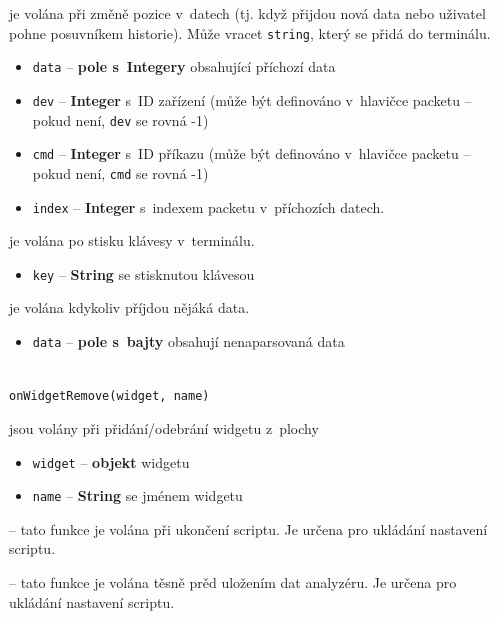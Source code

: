 \documentclass[12pt, a4paper, oneside]{article}
\begin{document}
 je volána při změně pozice v~datech (tj. když přijdou nová data nebo uživatel pohne posuvníkem historie). Může vracet \verb/string/, který se přidá do terminálu.

\begin{itemize}
    \item \verb/data/ -- {\bf pole s~Integery} obsahující příchozí data
    \item \verb/dev/ -- {\bf Integer} s~ID zařízení (může být definováno v~hlavičce packetu -- pokud není, \verb/dev/ se rovná -1)
    \item \verb/cmd/ -- {\bf Integer} s~ID příkazu (může být definováno v~hlavičce packetu -- pokud není, \verb/cmd/ se rovná -1)
    \item \verb/index/ -- {\bf Integer} s~indexem packetu v~příchozích datech.
\end{itemize}

 je volána po stisku klávesy v~terminálu.
\begin{itemize}
    \item \verb/key/ -- {\bf String} se stisknutou klávesou
\end{itemize}

 je volána kdykoliv příjdou nějáká data.
\begin{itemize}
    \item \verb/data/ -- {\bf pole s~bajty} obsahují nenaparsovaná data
\end{itemize}

 \\
{\color{blue}\verb/onWidgetRemove(widget, name)/}

jsou volány při přidání/odebrání widgetu z~plochy
\begin{itemize}
    \item \verb/widget/ -- {\bf objekt} widgetu
    \item \verb/name/ -- {\bf String} se jménem widgetu
\end{itemize}

 -- tato funkce je volána při ukončení scriptu. Je určena pro ukládání nastavení scriptu.

 -- tato funkce je volána těsně prěd uložením dat analyzéru. Je určena pro ukládání nastavení scriptu.
\end{document}
